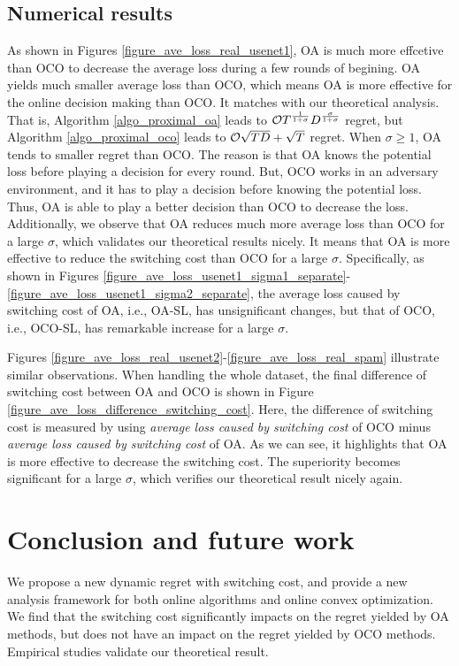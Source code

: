 \documentclass[journal]{IEEEtran}
\begin{document}
 


\subsection{Numerical results}

As shown in Figures \ref{figure_ave_loss_real_usenet1}, OA is much more effcetive than OCO to decrease the average loss during a few rounds of begining. OA yields much smaller average loss than OCO, which means OA is more effective for the online decision making than OCO. It matches with our theoretical analysis. That is, Algorithm \ref{algo_proximal_oa} leads to ${\mathcal{O}}{T^{\frac{1}{1+\sigma}}D^{\frac{\sigma}{1+\sigma}}}$ regret, but Algorithm \ref{algo_proximal_oco} leads to ${\mathcal{O}}{\sqrt{TD}+\sqrt{T}}$ regret. When $\sigma \ge 1$, OA tends to smaller regret than OCO. The reason is that OA knows the potential loss before playing a decision for every round. But, OCO works in an adversary environment, and it has to play a decision before knowing the potential loss.  Thus, OA is able to play a better decision than OCO to decrease the loss. Additionally, we observe that OA reduces much more average loss than OCO for a large $\sigma$, which validates our theoretical results nicely. It means that OA is more effective to reduce the switching cost than OCO for a large $\sigma$. Specifically, as shown in Figures \ref{figure_ave_loss_usenet1_sigma1_separate}-\ref{figure_ave_loss_usenet1_sigma2_separate}, the average loss caused by switching cost of OA, i.e., OA-SL, has unsignificant changes, but that of OCO, i.e., OCO-SL, has remarkable increase for a large $\sigma$. 

Figures \ref{figure_ave_loss_real_usenet2}-\ref{figure_ave_loss_real_spam} illustrate similar observations. When handling the whole dataset, the final difference of switching cost between OA and OCO is shown in Figure \ref{figure_ave_loss_difference_switching_cost}. Here, the difference of switching cost is measured by using \textit{average loss caused by switching cost} of OCO minus \textit{average loss caused by switching cost} of OA. As we can see, it highlights that OA is more effective to decrease the switching cost. The superiority becomes significant for a large $\sigma$, which verifies our theoretical result nicely again.  






\section{Conclusion and future work}
\label{sect_conclusion}
We propose a new  dynamic regret with switching cost,  and provide a new analysis framework for both online algorithms and online convex optimization.  We find that  the switching cost significantly impacts on the regret yielded by OA methods, but does not have an impact on the regret yielded by OCO methods. Empirical studies validate our theoretical result.
\end{document}
